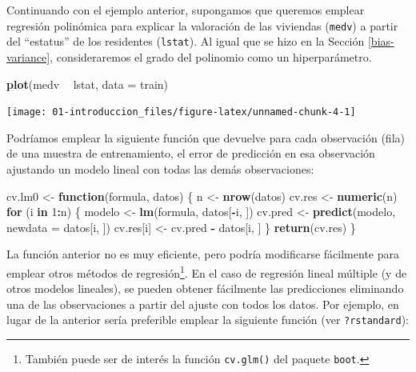 \documentclass[]{book}
\newenvironment{Shaded}{\begin{snugshade}}{\end{snugshade}}
\newcommand{\KeywordTok}[1]{\textcolor[rgb]{0.13,0.29,0.53}{\textbf{#1}}}
\newcommand{\DataTypeTok}[1]{\textcolor[rgb]{0.13,0.29,0.53}{#1}}
\newcommand{\DecValTok}[1]{\textcolor[rgb]{0.00,0.00,0.81}{#1}}
\newcommand{\StringTok}[1]{\textcolor[rgb]{0.31,0.60,0.02}{#1}}
\newcommand{\ControlFlowTok}[1]{\textcolor[rgb]{0.13,0.29,0.53}{\textbf{#1}}}
\newcommand{\OperatorTok}[1]{\textcolor[rgb]{0.81,0.36,0.00}{\textbf{#1}}}
\newcommand{\NormalTok}[1]{#1}
\theoremstyle{break}
\theoremstyle{definition}
\theoremstyle{definition}
\theoremstyle{definition}
\theoremstyle{remark}
\begin{document}
Continuando con el ejemplo anterior, supongamos que queremos emplear
regresión polinómica para explicar la valoración de las viviendas
(\texttt{medv}) a partir del ``estatus'' de los residentes
(\texttt{lstat}). Al igual que se hizo en la Sección
\ref{bias-variance}, consideraremos el grado del polinomio como un
hiperparámetro.

\begin{Shaded}
\begin{Highlighting}[]
\KeywordTok{plot}\NormalTok{(medv }\OperatorTok{~}\StringTok{ }\NormalTok{lstat, }\DataTypeTok{data =}\NormalTok{ train)}
\end{Highlighting}
\end{Shaded}

\begin{center}\texttt{[image: 01-introduccion\_files/figure-latex/unnamed-chunk-4-1]} \end{center}

Podríamos emplear la siguiente función que devuelve para cada
observación (fila) de una muestra de entrenamiento, el error de
predicción en esa observación ajustando un modelo lineal con todas las
demás observaciones:

\begin{Shaded}
\begin{Highlighting}[]
\NormalTok{cv.lm0 <-}\StringTok{ }\ControlFlowTok{function}\NormalTok{(formula, datos) \{}
\NormalTok{    n <-}\StringTok{ }\KeywordTok{nrow}\NormalTok{(datos)}
\NormalTok{    cv.res <-}\StringTok{ }\KeywordTok{numeric}\NormalTok{(n)}
    \ControlFlowTok{for}\NormalTok{ (i }\ControlFlowTok{in} \DecValTok{1}\OperatorTok{:}\NormalTok{n) \{}
\NormalTok{        modelo <-}\StringTok{ }\KeywordTok{lm}\NormalTok{(formula, datos[}\OperatorTok{-}\NormalTok{i, ])}
\NormalTok{        cv.pred <-}\StringTok{ }\KeywordTok{predict}\NormalTok{(modelo, }\DataTypeTok{newdata =}\NormalTok{ datos[i, ])}
\NormalTok{        cv.res[i] <-}\StringTok{ }\NormalTok{cv.pred }\OperatorTok{-}\StringTok{ }\NormalTok{datos[i, ]}
\NormalTok{    \}}
    \KeywordTok{return}\NormalTok{(cv.res)}
\NormalTok{\}}
\end{Highlighting}
\end{Shaded}

La función anterior no es muy eficiente, pero podría modificarse
fácilmente para emplear otros métodos de regresión\footnote{También
  puede ser de interés la función \texttt{cv.glm()} del paquete
  \texttt{boot}.}. En el caso de regresión lineal múltiple (y de otros
modelos lineales), se pueden obtener fácilmente las predicciones
eliminando una de las observaciones a partir del ajuste con todos los
datos. Por ejemplo, en lugar de la anterior sería preferible emplear la
siguiente función (ver \texttt{?rstandard}):
\end{document}
